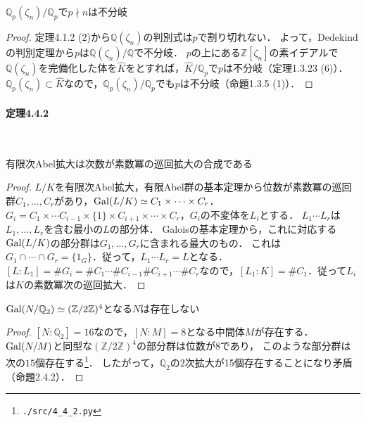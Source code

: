 \begin{screen}
  $\mathbb{Q}_p(\zeta_{n})/\mathbb{Q}_p$で$p\nmid n$は不分岐
\end{screen}
\begin{proof}
  定理4.1.2 (2)から$\mathbb{Q}(\zeta_{n})$の判別式は$p$で割り切れない．
  よって，Dedekindの判別定理から$p$は$\mathbb{Q}(\zeta_{n})/\mathbb{Q}$で不分岐．
  $p$の上にある$\mathbb{Z}[\zeta_n]$の素イデアルで$\mathbb{Q}(\zeta_n)$を完備化した体を$\widehat{K}$をとすれば，$\widehat{K}/\mathbb{Q}_p$で$p$は不分岐（定理1.3.23 (6)）．
  $\mathbb{Q}_p(\zeta_n)\subset\widehat{K}$なので，$\mathbb{Q}_p(\zeta_n)/\mathbb{Q}_p$でも$p$は不分岐（命題1.3.5 (1)）．
\end{proof}

\paragraph{定理4.4.2}~
\begin{screen}
  有限次Abel拡大は次数が素数冪の巡回拡大の合成である
\end{screen}
\begin{proof}
  $L/K$を有限次Abel拡大，有限Abel群の基本定理から位数が素数冪の巡回群$C_1,\ldots,C_r$があり，$\operatorname{Gal}(L/K)\simeq C_1\times\cdots\times C_r$．
  $G_i=C_1\times\cdots C_{i-1}\times\{1\}\times C_{i+1}\times\cdots\times C_r$，$G_i$の不変体を$L_i$とする．
  $L_1\cdots L_r$は$L_1,\ldots,L_r$を含む最小の$L$の部分体．
  Galoisの基本定理から，これに対応する$\operatorname{Gal}(L/K)$の部分群は$G_1,\ldots,G_r$に含まれる最大のもの．
  これは$G_1\cap\cdots\cap G_r=\{1_G\}$．従って，$L_1\cdots L_r=L$となる．
  $[L:L_1]=\# G_i=\# C_1\cdots \#C_{i-1}\# C_{i+1}\cdots\# C_r$なので，$[L_1:K]=\# C_1$．従って$L_i$は$K$の素数冪次の巡回拡大．
\end{proof}

\begin{screen}
  $\operatorname{Gal}(N/\mathbb{Q}_2)\simeq(\mathbb{Z}/2\mathbb{Z})^4$となる$N$は存在しない
\end{screen}
\begin{proof}
  $[N:\mathbb{Q}_2]=16$なので，$[N:M]=8$となる中間体$M$が存在する．
  $\operatorname{Gal}(N/M)$と同型な$(\mathbb{Z}/2\mathbb{Z})^4$の部分群は位数が$8$であり，
  このような部分群は次の$15$個存在する\footnote{\verb|./src/4_4_2.py|}．
  したがって，$\mathbb{Q}_2$の$2$次拡大が15個存在することになり矛盾（命題2.4.2）．
\end{proof}

